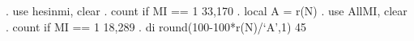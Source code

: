 . use hesinmi, clear
{\smallskip}
. count if MI == 1
  33,170
{\smallskip}
. local A = r(N)
{\smallskip}
. use AllMI, clear
{\smallskip}
. count if MI == 1
  18,289
{\smallskip}
. di round(100-100*r(N)/`A',1)
45
{\smallskip}
